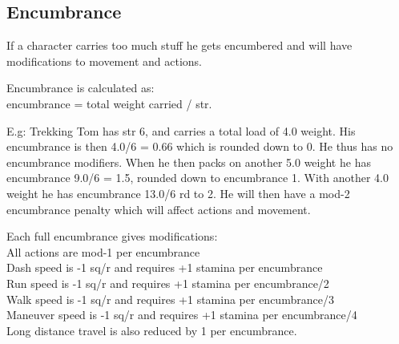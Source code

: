















\subsection*{Encumbrance}
If a character carries too much stuff he gets encumbered and will have modifications to movement and actions.

\noindent 
Encumbrance is calculated as: \\
encumbrance = total weight carried / str.

E.g: Trekking Tom has str 6, and carries a total load of 4.0 weight. His encumbrance is then 4.0/6 = 0.66 which is rounded down to 0. He thus has no encumbrance modifiers. When he then packs on another 5.0 weight he has encumbrance 9.0/6 = 1.5, rounded down to encumbrance 1. With another 4.0 weight he has encumbrance 13.0/6 rd to 2. He will then have a mod-2 encumbrance penalty which will affect actions and movement.

\noindent
Each full encumbrance gives modifications: \\
All actions are mod-1 per encumbrance \\
Dash speed is -1 sq/r and requires +1 stamina per encumbrance \\
Run speed is -1 sq/r and requires +1 stamina per encumbrance/2 \\
Walk speed is -1 sq/r and requires +1 stamina per encumbrance/3 \\
Maneuver speed is -1 sq/r and requires +1 stamina per encumbrance/4 \\
Long distance travel is also reduced by 1 per encumbrance. \\


